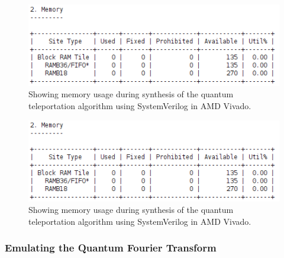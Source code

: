 \begin{figure}[!ht]
	\centering
	\includegraphics[width=0.45\linewidth]{body/ch6/figs/qta-memory}
	\caption[Showing Results from Synthesis of the Quantum Teleportation Algorithm]{Showing memory usage during synthesis of the quantum teleportation algorithm using SystemVerilog in AMD Vivado.}
\label{fig:qta-4}
\end{figure}

\begin{figure}[!ht]
	\centering
	\includegraphics[width=0.45\linewidth]{body/ch6/figs/qta-memory}
	\caption[Showing Results from Synthesis of the Quantum Teleportation Algorithm]{Showing memory usage during synthesis of the quantum teleportation algorithm using SystemVerilog in AMD Vivado.}
\label{fig:qta-5}
\end{figure}

\subsubsection{Emulating the Quantum Fourier Transform}


